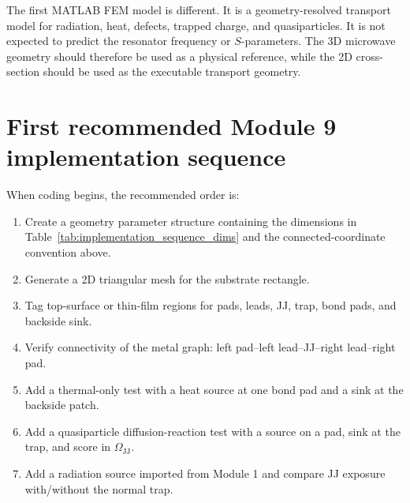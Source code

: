 \documentclass[11pt]{article}
\begin{document}
The first MATLAB FEM model is different. It is a geometry-resolved transport model for radiation, heat, defects, trapped charge, and quasiparticles. It is not expected to predict the resonator frequency or $S$-parameters. The 3D microwave geometry should therefore be used as a physical reference, while the 2D cross-section should be used as the executable transport geometry.

\section{First recommended Module 9 implementation sequence}
When coding begins, the recommended order is:
\begin{enumerate}[leftmargin=1.5em]
    \item Create a geometry parameter structure containing the dimensions in Table~\ref{tab:implementation_sequence_dims} and the connected-coordinate convention above.
    \item Generate a 2D triangular mesh for the substrate rectangle.
    \item Tag top-surface or thin-film regions for pads, leads, JJ, trap, bond pads, and backside sink.
    \item Verify connectivity of the metal graph: left pad--left lead--JJ--right lead--right pad.
    \item Add a thermal-only test with a heat source at one bond pad and a sink at the backside patch.
    \item Add a quasiparticle diffusion-reaction test with a source on a pad, sink at the trap, and score in $\Omega_{\mathrm{JJ}}$.
    \item Add a radiation source imported from Module 1 and compare JJ exposure with/without the normal trap.
\end{enumerate}
\end{document}
